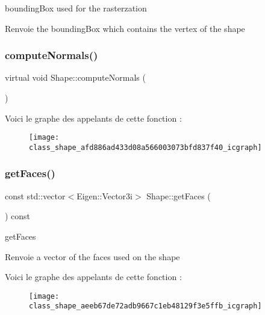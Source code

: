 bounding\+Box used for the rasterzation 

\begin{DoxyReturn}{Renvoie}
the bounding\+Box which contains the vertex of the shape 
\end{DoxyReturn}
\mbox{\label{class_shape_afd886ad433d08a566003073bfd837f40}} 
\subsubsection{\texorpdfstring{compute\+Normals()}{computeNormals()}}
{\footnotesize\ttfamily virtual void Shape\+::compute\+Normals (\begin{DoxyParamCaption}{ }\end{DoxyParamCaption})\hspace{0.3cm}{\ttfamily [pure virtual]}}

Voici le graphe des appelants de cette fonction \+:\nopagebreak
\begin{figure}[H]
\begin{center}
\leavevmode
\texttt{[image: class\_shape\_afd886ad433d08a566003073bfd837f40\_icgraph]}
\end{center}
\end{figure}
\mbox{\label{class_shape_aeeb67de72adb9667c1eb48129f3e5ffb}} 
\subsubsection{\texorpdfstring{get\+Faces()}{getFaces()}}
{\footnotesize\ttfamily const std\+::vector$<$Eigen\+::\+Vector3i$>$ Shape\+::get\+Faces (\begin{DoxyParamCaption}{ }\end{DoxyParamCaption}) const\hspace{0.3cm}{\ttfamily [inline]}}



get\+Faces 

\begin{DoxyReturn}{Renvoie}
a vector of the faces used on the shape 
\end{DoxyReturn}
Voici le graphe des appelants de cette fonction \+:\nopagebreak
\begin{figure}[H]
\begin{center}
\leavevmode
\texttt{[image: class\_shape\_aeeb67de72adb9667c1eb48129f3e5ffb\_icgraph]}
\end{center}
\end{figure}
\mbox{\label{class_shape_a9a1f2d5c370b8c9194fc51ea37a03cac}} 

